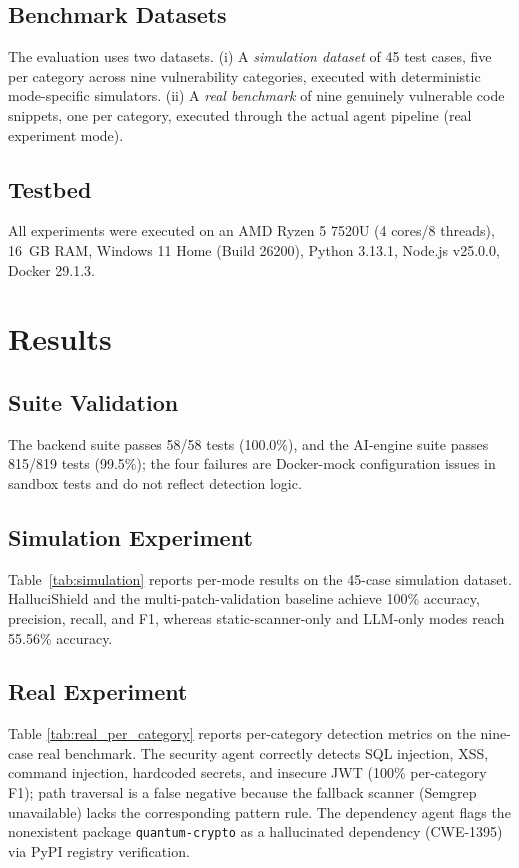 \documentclass[conference]{IEEEtran}
\begin{document}
\subsection{Benchmark Datasets}
The evaluation uses two datasets. (i) A \emph{simulation dataset} of 45 test
cases, five per category across nine vulnerability categories, executed with
deterministic mode-specific simulators. (ii) A \emph{real benchmark} of nine
genuinely vulnerable code snippets, one per category, executed through the
actual agent pipeline (real experiment mode).

\subsection{Testbed}
All experiments were executed on an AMD Ryzen 5 7520U (4 cores/8 threads),
16~GB RAM, Windows 11 Home (Build 26200), Python 3.13.1, Node.js v25.0.0,
Docker 29.1.3.

\section{Results}
\label{sec:results}

\subsection{Suite Validation}
The backend suite passes 58/58 tests (100.0\%), and the AI-engine suite
passes 815/819 tests (99.5\%); the four failures are Docker-mock
configuration issues in sandbox tests and do not reflect detection logic.

\subsection{Simulation Experiment}
Table~\ref{tab:simulation} reports per-mode results on the 45-case simulation
dataset. HalluciShield and the multi-patch-validation baseline achieve 100\%
accuracy, precision, recall, and F1, whereas static-scanner-only and LLM-only
modes reach 55.56\% accuracy.



\subsection{Real Experiment}
Table \ref{tab:real_per_category} reports per-category detection metrics on
the nine-case real benchmark. The security agent correctly detects SQL
injection, XSS, command injection, hardcoded secrets, and insecure JWT
(100\% per-category F1); path traversal is a false negative because the
fallback scanner (Semgrep unavailable) lacks the corresponding pattern rule.
The dependency agent flags the nonexistent package \texttt{quantum-crypto} as
a hallucinated dependency (CWE-1395) via PyPI registry verification.
\end{document}
